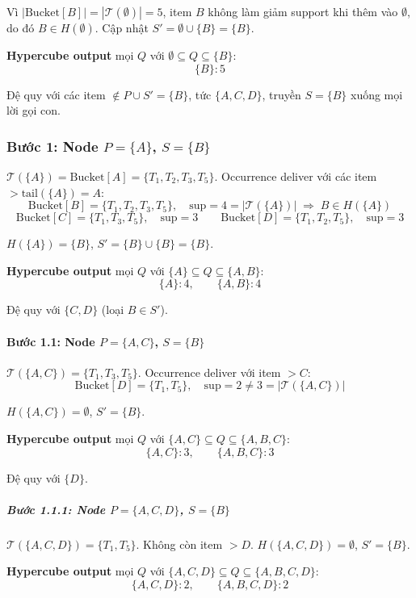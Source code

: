 \documentclass[12pt,a4paper]{article}
\theoremstyle{definition}
\begin{document}
Vì $|\text{Bucket}[B]| = |\mathcal{T}(\emptyset)| = 5$, item $B$ không làm
giảm support khi thêm vào $\emptyset$, do đó $B \in H(\emptyset)$.
Cập nhật $S' = \emptyset \cup \{B\} = \{B\}$.

\textbf{Hypercube output}  mọi $Q$ với
$\emptyset \subseteq Q \subseteq \{B\}$:
\[
    \{B\}:5
\]

Đệ quy với các item $\notin P \cup S' = \{B\}$,
tức $\{A,C,D\}$, truyền $S=\{B\}$ xuống mọi lời gọi con.

\subsubsection{Bước 1: Node $P=\{A\}$, $S=\{B\}$}

$\mathcal{T}(\{A\}) = \text{Bucket}[A] = \{T_1,T_2,T_3,T_5\}$.
Occurrence deliver với các item $> \mathrm{tail}(\{A\}) = A$:
\[
    \text{Bucket}[B] = \{T_1,T_2,T_3,T_5\},\quad \mathrm{sup}=4
    = |\mathcal{T}(\{A\})| \;\Rightarrow\; B \in H(\{A\})
\]
\[
    \text{Bucket}[C] = \{T_1,T_3,T_5\},\quad \mathrm{sup}=3
    \qquad
    \text{Bucket}[D] = \{T_1,T_2,T_5\},\quad \mathrm{sup}=3
\]

$H(\{A\}) = \{B\}$, $S' = \{B\} \cup \{B\} = \{B\}$.

\textbf{Hypercube output}  mọi $Q$ với
$\{A\} \subseteq Q \subseteq \{A,B\}$:
\[
    \{A\}:4,\qquad \{A,B\}:4
\]

Đệ quy với $\{C,D\}$ (loại $B \in S'$).

\paragraph{Bước 1.1: Node $P=\{A,C\}$, $S=\{B\}$}

$\mathcal{T}(\{A,C\}) = \{T_1,T_3,T_5\}$.
Occurrence deliver với item $> C$:
\[
    \text{Bucket}[D] = \{T_1,T_5\},\quad \mathrm{sup}=2
    \neq 3 = |\mathcal{T}(\{A,C\})|
\]

$H(\{A,C\}) = \emptyset$, $S' = \{B\}$.

\textbf{Hypercube output}  mọi $Q$ với
$\{A,C\} \subseteq Q \subseteq \{A,B,C\}$:
\[
    \{A,C\}:3,\qquad \{A,B,C\}:3
\]

Đệ quy với $\{D\}$.

\subparagraph{Bước 1.1.1: Node $P=\{A,C,D\}$, $S=\{B\}$}

$\mathcal{T}(\{A,C,D\}) = \{T_1,T_5\}$. Không còn item $> D$.
$H(\{A,C,D\}) = \emptyset$, $S' = \{B\}$.

\textbf{Hypercube output}  mọi $Q$ với
$\{A,C,D\} \subseteq Q \subseteq \{A,B,C,D\}$:
\[
    \{A,C,D\}:2,\qquad \{A,B,C,D\}:2
\]
\end{document}
